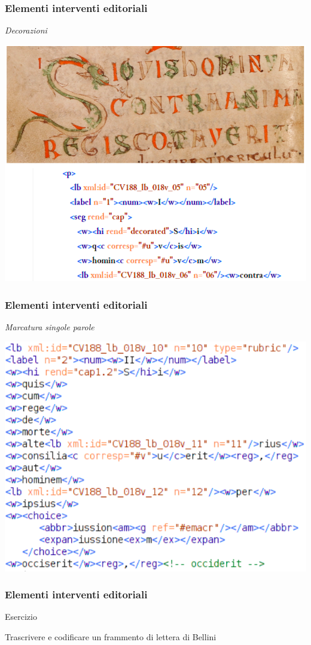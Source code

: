 \begin{frame}
    \frametitle{Elementi interventi editoriali}
    \addtocounter{nframe}{1}
    
    \textit{Decorazioni}
        \begin{center}
            \includegraphics[width=.9\textwidth]{imgs/Decorazioni.png}
        \end{center}
\end{frame}

\begin{frame}
    \frametitle{Elementi interventi editoriali}
    \addtocounter{nframe}{1}
    
    \textit{Marcatura singole parole}
        \begin{center}
            \includegraphics[width=.9\textwidth]{imgs/MarcaturaParole.png}
        \end{center}
    
    
\end{frame}

\begin{frame}
    \frametitle{Elementi interventi editoriali}
    \addtocounter{nframe}{1}
    
   
    \begin{block}{Esercizio}
        \begin{center}
            Trascrivere e codificare un frammento di lettera di Bellini
        \end{center}
    \end{block}
\end{frame}
